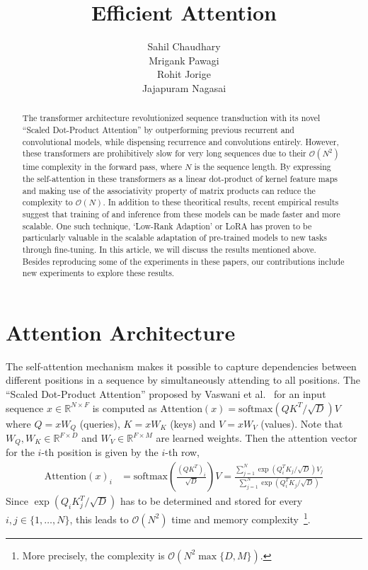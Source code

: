 \documentclass{article}
\title{Efficient Attention}
\author{
  Sahil Chaudhary \\
  \And
  Mrigank Pawagi \\
  \And
  Rohit Jorige \\
  \And
  Jajapuram Nagasai \\
}
\newcommand{\todo}[1]{\textcolor{red}{#1}}
\newcommand{\R}{\mathbb{R}}
\begin{document}
\maketitle


\begin{abstract}

    The transformer architecture revolutionized sequence transduction with its novel ``Scaled Dot-Product Attention'' by outperforming previous recurrent and convolutional models, while dispensing recurrence and convolutions entirely. However, these transformers are prohibitively slow for very long sequences due to their $\mathcal{O}(N^2)$ time complexity in the forward pass, where $N$ is the sequence length. By expressing the self-attention in these transformers as a linear dot-product of kernel feature maps and making use of the associativity property of matrix products can reduce the complexity to $\mathcal{O}(N)$. In addition to these theoritical results, recent empirical results suggest that training of and inference from these models can be made faster and more scalable. One such technique, `Low-Rank Adaption' or LoRA has proven to be particularly valuable in the scalable adaptation of pre-trained models to new tasks through fine-tuning. In this article, we will discuss the results mentioned above. Besides reproducing some of the experiments in these papers, our contributions include new experiments to explore these results. 
\end{abstract}



\section{Attention Architecture}
    The self-attention mechanism makes it possible to capture dependencies between different positions in a sequence by simultaneously attending to all positions. The ``Scaled Dot-Product Attention'' proposed by Vaswani et al.~\cite{vaswaniAttention} for an input sequence $x \in \R^{N \times F}$ is computed as $\text{Attention}(x) = \text{softmax}(QK^T/\sqrt{D})V$
    where $Q = xW_Q$ (queries), $K = xW_K$ (keys) and $V = xW_V$ (values). Note that $W_Q, W_K \in \R^{F \times D}$ and $W_V \in \R^{F \times M}$ are learned weights. Then the attention vector for the $i$-th position is given by the $i$-th row,
    \begin{align*}
        \text{Attention}(x)_i &= \text{softmax}\left(\frac{(QK^T)_i}{\sqrt{D}} \right) V = \frac{\sum_{j=1}^N \exp(Q_i^TK_j/\sqrt{D})V_j}{\sum_{j=1}^N \exp(Q_i^TK_j/\sqrt{D})} 
    \end{align*}
    Since $\exp(Q_i K_j^T / \sqrt{D})$ has to be determined and stored for every $i, j \in \{1, \ldots, N\}$, this leads to $\mathcal{O}(N^2)$ time and memory complexity~\footnote{More precisely, the complexity is $\mathcal{O}(N^2\max\{D, M\})$.}.
\end{document}
